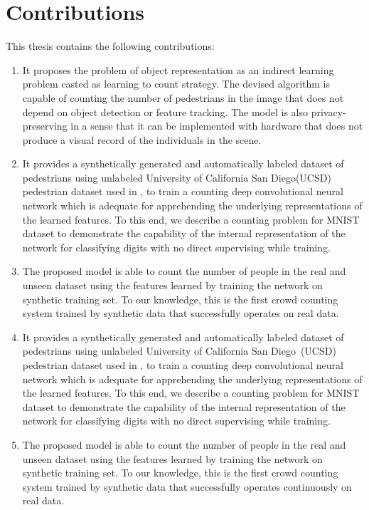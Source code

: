 \section{Contributions}
This thesis contains the following contributions:
\begin{enumerate}
	\item It proposes the problem of object representation as an indirect learning problem casted as learning to count strategy. The devised algorithm is capable of counting the number of pedestrians in the image that does not depend on object detection or feature tracking. The model is also privacy-preserving in a sense that it can be implemented with hardware that does not produce a visual record of the individuals in the scene. 

	\item It provides a synthetically generated and automatically labeled dataset of pedestrians using unlabeled University of California San Diego(UCSD) pedestrian dataset used in \cite{mahadevan2010anomaly}, to train a counting deep convolutional neural network which is adequate for apprehending the underlying representations of the learned features. To this end, we describe a counting problem for MNIST dataset to demonstrate the capability of the internal representation of the network for classifying digits with no direct supervising while training. 
	\item The proposed model is able to count the number of people in the real and unseen dataset using the features learned by training the network on synthetic training set. To our knowledge, this is the first crowd counting system trained by synthetic data that successfully operates on real data. 

	\item It provides a synthetically generated and automatically labeled dataset of pedestrians using unlabeled University of California San Diego~(UCSD) pedestrian dataset used in \cite{mahadevan2010anomaly}, to train a counting deep convolutional neural network which is adequate for apprehending the underlying representations of the learned features. To this end, we describe a counting problem for MNIST dataset to demonstrate the capability of the internal representation of the network for classifying digits with no direct supervising while training. 
	\item The proposed model is able to count the number of people in the real and unseen dataset using the features learned by training the network on synthetic training set. To our knowledge, this is the first crowd counting system trained by synthetic data that successfully operates continuously on real data. 


\end{enumerate}

